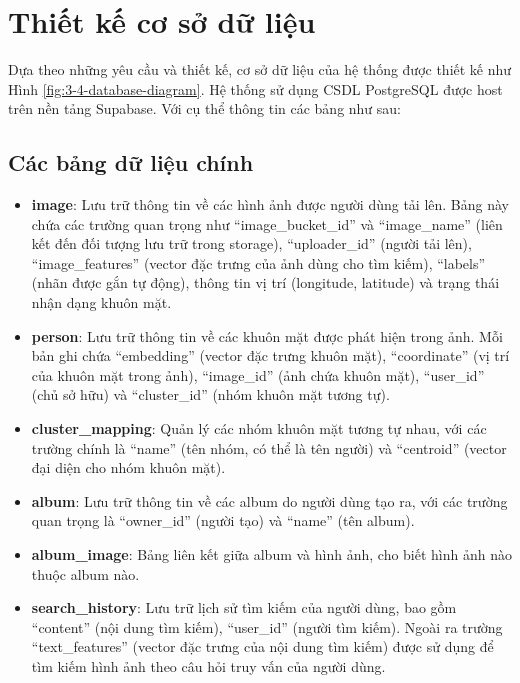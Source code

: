 \section{Thiết kế cơ sở dữ liệu}


Dựa theo những yêu cầu và thiết kế, cơ sở dữ liệu của hệ thống được thiết kế
như Hình \ref{fig:3-4-database-diagram}. Hệ thống sử dụng CSDL PostgreSQL được host trên nền tảng Supabase. Với cụ thể thông tin các bảng như sau: 
\subsection{Các bảng dữ liệu chính}
\begin{itemize}
    \item \textbf{image}: Lưu trữ thông tin về các hình ảnh được người dùng tải lên. Bảng này chứa các trường quan trọng như ``image\_bucket\_id'' và ``image\_name'' (liên kết đến đối tượng lưu trữ trong storage), ``uploader\_id'' (người tải lên), ``image\_features'' (vector đặc trưng của ảnh dùng cho tìm kiếm), ``labels'' (nhãn được gắn tự động), thông tin vị trí (longitude, latitude) và trạng thái nhận dạng khuôn mặt.
    
    \item \textbf{person}: Lưu trữ thông tin về các khuôn mặt được phát hiện trong ảnh. Mỗi bản ghi chứa ``embedding'' (vector đặc trưng khuôn mặt), ``coordinate'' (vị trí của khuôn mặt trong ảnh), ``image\_id'' (ảnh chứa khuôn mặt), ``user\_id'' (chủ sở hữu) và ``cluster\_id'' (nhóm khuôn mặt tương tự).
    
    \item \textbf{cluster\_mapping}: Quản lý các nhóm khuôn mặt tương tự nhau, với các trường chính là ``name'' (tên nhóm, có thể là tên người) và ``centroid'' (vector đại diện cho nhóm khuôn mặt).
    
    \item \textbf{album}: Lưu trữ thông tin về các album do người dùng tạo ra, với các trường quan trọng là ``owner\_id'' (người tạo) và ``name'' (tên album).
    
    \item \textbf{album\_image}: Bảng liên kết giữa album và hình ảnh, cho biết hình ảnh nào thuộc album nào.
    
    \item \textbf{search\_history}: Lưu trữ lịch sử tìm kiếm của người dùng, bao gồm ``content'' (nội dung tìm kiếm), ``user\_id'' (người tìm kiếm). Ngoài ra trường ``text\_features'' (vector đặc trưng của nội dung tìm kiếm) được sử dụng để tìm kiếm hình ảnh theo câu hỏi truy vấn của người dùng. 
    

\end{itemize}
